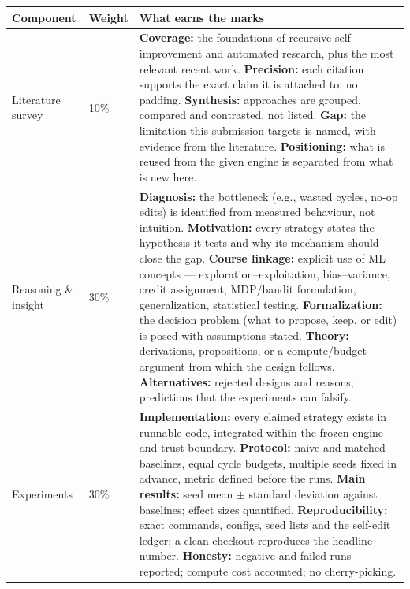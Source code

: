 \documentclass{article}
\begin{document}
\vspace{10pt}
\begin{center}
\small
\begin{tabular}{@{}p{3.1cm}p{1.4cm}p{14.1cm}@{}}
\toprule
\textbf{Component} & \textbf{Weight} & \textbf{What earns the marks} \\
\midrule
Literature survey & 10\% & \textbf{Coverage:} the foundations of recursive self-improvement and automated research, plus the most relevant recent work. \newline \textbf{Precision:} each citation supports the exact claim it is attached to; no padding. \newline \textbf{Synthesis:} approaches are grouped, compared and contrasted, not listed. \newline \textbf{Gap:} the limitation this submission targets is named, with evidence from the literature. \newline \textbf{Positioning:} what is reused from the given engine is separated from what is new here. \\
\addlinespace[5pt]
\midrule
Reasoning \& insight & 30\% & \textbf{Diagnosis:} the bottleneck (e.g., wasted cycles, no-op edits) is identified from measured behaviour, not intuition. \newline \textbf{Motivation:} every strategy states the hypothesis it tests and why its mechanism should close the gap. \newline \textbf{Course linkage:} explicit use of ML concepts --- exploration--exploitation, bias--variance, credit assignment, MDP/bandit formulation, generalization, statistical testing. \newline \textbf{Formalization:} the decision problem (what to propose, keep, or edit) is posed with assumptions stated. \newline \textbf{Theory:} derivations, propositions, or a compute/budget argument from which the design follows. \newline \textbf{Alternatives:} rejected designs and reasons; predictions that the experiments can falsify. \\
\addlinespace[5pt]
\midrule
Experiments & 30\% & \textbf{Implementation:} every claimed strategy exists in runnable code, integrated within the frozen engine and trust boundary. \newline \textbf{Protocol:} naive and matched baselines, equal cycle budgets, multiple seeds fixed in advance, metric defined before the runs. \newline \textbf{Main results:} seed mean $\pm$ standard deviation against baselines; effect sizes quantified. \newline \textbf{Reproducibility:} exact commands, configs, seed lists and the self-edit ledger; a clean checkout reproduces the headline number. \newline \textbf{Honesty:} negative and failed runs reported; compute cost accounted; no cherry-picking. \\

\end{tabular}
\end{center}
\end{document}
